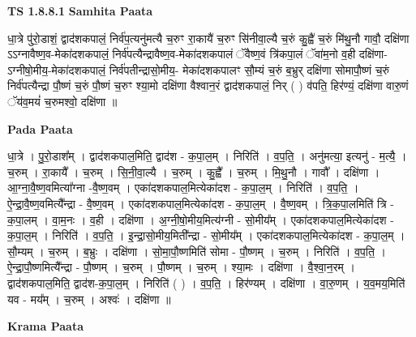 \documentclass[17pt]{extarticle}
\begin{document}
\textbf{TS 1.8.8.1 } \newline
\textbf{Samhita Paata} \newline

धा॒त्रे पु॑रो॒डाशं॒ द्वाद॑शकपालं॒ निर्व॑प॒त्यनु॑मत्यै च॒रुꣳ रा॒कायै॑ च॒रुꣳ सि॑नीवा॒ल्यै च॒रुं कु॒ह्वै॑ च॒रुं मि॑थु॒नौ गावौ॒ दक्षि॑णा ऽऽग्नावैष्ण॒व-मेका॑दशकपालं॒ निर्व॑पत्यैन्द्रावैष्ण॒व-मेका॑दशकपालं ॅवैष्ण॒वं त्रि॑कपा॒लं ॅवा॑म॒नो व॒ही दक्षि॑णा-ऽग्नीषो॒मीय॒-मेका॑दशकपालं॒ निर्व॑पतीन्द्रासो॒मीय॒- मेका॑दशकपालꣳ सौ॒म्यं च॒रुं ब॒भ्रुर् दक्षि॑णा सोमापौ॒ष्णं च॒रुं निर्व॑पत्यैन्द्रा पौ॒ष्णं च॒रुं पौ॒ष्णं च॒रुꣳ श्या॒मो दक्षि॑णा वैश्वान॒रं द्वाद॑शकपालं॒ निर् ( ) व॑पति॒ हिर॑ण्यं॒ दक्षि॑णा वारु॒णं ॅय॑व॒मयं॑ च॒रुमश्वो॒ दक्षि॑णा ॥ \newline

\textbf{Pada Paata} \newline

धा॒त्रे । पु॒रो॒डाश᳚म् । द्वाद॑शकपाल॒मिति॒ द्वाद॑श - क॒पा॒ल॒म् । निरिति॑ । व॒प॒ति॒ । अनु॑मत्या॒ इत्यनु॑ - म॒त्यै॒ । च॒रुम् । रा॒कायै᳚ । च॒रुम् । सि॒नी॒वा॒ल्यै । च॒रुम् । कु॒ह्वै᳚ । च॒रुम् । मि॒थु॒नौ । गावौ᳚ । दक्षि॑णा । आ॒ग्ना॒वै॒ष्ण॒वमित्या᳚ग्ना -वै॒ष्ण॒वम् । एका॑दशकपाल॒मित्येका॑दश - क॒पा॒ल॒म् । निरिति॑ । व॒प॒ति॒ । ऐ॒न्द्रा॒वै॒ष्ण॒वमित्यै᳚न्द्रा - वै॒ष्ण॒वम् । एका॑दशकपाल॒मित्येका॑दश - क॒पा॒ल॒म् । वै॒ष्ण॒वम् । त्रि॒क॒पा॒लमिति॑ त्रि - क॒पा॒लम् । वा॒म॒नः । व॒ही । दक्षि॑णा । अ॒ग्नी॒षो॒मीय॒मित्य॑ग्नी - सो॒मीय᳚म् । एका॑दशकपाल॒मित्येका॑दश - क॒पा॒ल॒म् । निरिति॑ । व॒प॒ति॒ । इ॒न्द्रा॒सो॒मीय॒मिती᳚न्द्रा - सो॒मीय᳚म् । एका॑दशकपाल॒मित्येका॑दश - क॒पा॒ल॒म् । सौ॒म्यम् । च॒रुम् । ब॒भ्रुः । दक्षि॑णा । सो॒मा॒पौ॒ष्णमिति॑ सोमा - पौ॒ष्णम् । च॒रुम् । निरिति॑ । व॒प॒ति॒ । ऐ॒न्द्रा॒पौ॒ष्णमित्यै᳚न्द्रा - पौ॒ष्णम् । च॒रुम् । पौ॒ष्णम् । च॒रुम् । श्या॒मः । दक्षि॑णा । वै॒श्वा॒न॒रम् । द्वाद॑शकपाल॒मिति॒ द्वाद॑श-क॒पा॒ल॒म् । निरिति॑ ( ) । व॒प॒ति॒ । हिर॑ण्यम् । दक्षि॑णा । वा॒रु॒णम् । य॒व॒मय॒मिति॑ यव - मय᳚म् । च॒रुम् । अश्वः॑ । दक्षि॑णा ॥  \newline


\textbf{Krama Paata} \newline
\end{document}
